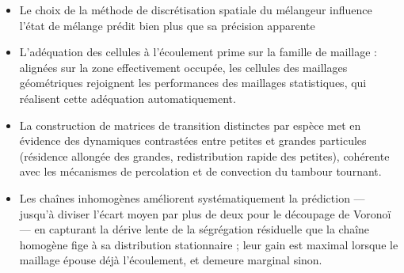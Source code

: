 \documentclass[french]{MemoireMaster}
\begin{document}
\begin{itemize}
  \item Le choix de la méthode de discrétisation spatiale du mélangeur influence l'état de mélange prédit bien plus que sa précision apparente 
  \item L'adéquation des cellules à l'écoulement prime sur la famille de maillage : alignées sur la zone effectivement occupée, les cellules des maillages géométriques rejoignent les performances des maillages statistiques, qui réalisent cette adéquation automatiquement.
  \item La construction de matrices de transition distinctes par espèce met en évidence des dynamiques contrastées entre petites et grandes particules (résidence allongée des grandes, redistribution rapide des petites), cohérente avec les mécanismes de percolation et de convection du tambour tournant.
  \item Les chaînes inhomogènes améliorent systématiquement la prédiction --- jusqu'à diviser l'écart moyen par plus de deux pour le découpage de Voronoï --- en capturant la dérive lente de la ségrégation résiduelle que la chaîne homogène fige à sa distribution stationnaire ; leur gain est maximal lorsque le maillage épouse déjà l'écoulement, et demeure marginal sinon.
\end{itemize}
\end{document}
